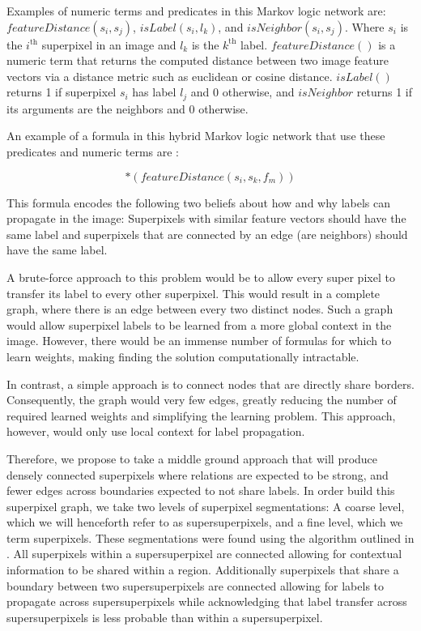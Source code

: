 \documentclass{article} %
\begin{document}
Examples of numeric terms and predicates in this Markov logic network are: $featureDistance(s_i,s_j)$, $isLabel(s_i,l_k)$, and $isNeighbor(s_i,s_j)$. Where $s_i$ is the $i^\textrm{th}$ superpixel in an image and $l_k$ is the $k^\textrm{th}$ label. $featureDistance()$ is a numeric term that returns the computed distance between two image feature vectors via a distance metric such as euclidean or cosine distance. $isLabel()$ returns 1 if superpixel $s_i$ has label $l_j$ and 0 otherwise, and $isNeighbor$ returns 1 if its arguments are the neighbors and 0 otherwise. 

An example of a formula in this hybrid Markov logic network that use these predicates and numeric terms are :

\begin{equation*}
	[isNeighbor(s_i,s_j) \Rightarrow (isLabel(s_i,l_k) \Leftrightarrow isLabel(s_k,l_m))]*(featureDistance(s_i, s_k, f_m))
\end{equation*}

This formula encodes the following two beliefs about how and why labels can propagate in the image:	Superpixels with similar feature vectors should have the same label and superpixels that are connected by an edge (are neighbors) should have the same label.

A brute-force approach to this problem would be to allow every super pixel to transfer its label to every other superpixel. This would result in a complete graph, where there is an edge between every two distinct nodes. Such a graph would allow superpixel labels to be learned from a more global context in the image. However, there would be an immense number of formulas for which to learn weights, making finding the solution computationally intractable. 

In contrast, a simple approach is to connect nodes that are directly share borders. Consequently, the graph would very few edges, greatly reducing the number of required learned weights and simplifying the learning problem. This approach, however, would only use local context for label propagation.

Therefore, we propose to take a middle ground approach that will produce densely connected superpixels where relations are expected to be strong, and fewer edges across boundaries expected to not share labels. In order build this superpixel graph, we take two levels of superpixel segmentations: A coarse level, which we will henceforth refer to as supersuperpixels, and a fine level, which we term superpixels. These segmentations were found using the algorithm outlined in \cite{Superpixel}. All superpixels within a supersuperpixel are connected allowing for contextual information to be shared within a region. Additionally superpixels that share a boundary between two supersuperpixels are connected allowing for labels to propagate across supersuperpixels while acknowledging that label transfer across supersuperpixels is less probable than within a supersuperpixel.
\end{document}
